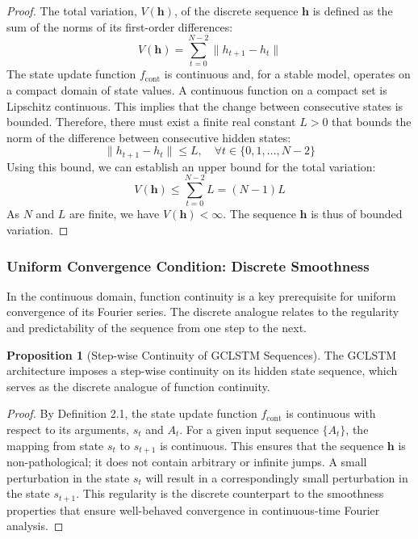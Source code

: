\documentclass{article}
\theoremstyle{remark}
\theoremstyle{definition}
\newtheorem{proposition}[theorem]{Proposition}
\begin{document}
\begin{proof}
The total variation, $V(\mathbf{h})$, of the discrete sequence $\mathbf{h}$ is defined as the sum of the norms of its first-order differences:
\begin{equation}
    V(\mathbf{h}) = \sum_{t=0}^{N-2} \|h_{t+1} - h_t\|
\end{equation}
The state update function $f_{\text{cont}}$ is continuous and, for a stable model, operates on a compact domain of state values. A continuous function on a compact set is Lipschitz continuous. This implies that the change between consecutive states is bounded. Therefore, there must exist a finite real constant $L > 0$ that bounds the norm of the difference between consecutive hidden states:
\begin{equation}
    \|h_{t+1} - h_t\| \le L, \quad \forall t \in \{0, 1, \dots, N-2\}
\end{equation}
Using this bound, we can establish an upper bound for the total variation:
\begin{equation}
    V(\mathbf{h}) \le \sum_{t=0}^{N-2} L = (N-1)L
\end{equation}
As $N$ and $L$ are finite, we have $V(\mathbf{h}) < \infty$. The sequence $\mathbf{h}$ is thus of bounded variation.
\end{proof}


\subsubsection{Uniform Convergence Condition: Discrete Smoothness}
In the continuous domain, function continuity is a key prerequisite for uniform convergence of its Fourier series. The discrete analogue relates to the regularity and predictability of the sequence from one step to the next.

\begin{proposition}[Step-wise Continuity of GCLSTM Sequences]
The GCLSTM architecture imposes a step-wise continuity on its hidden state sequence, which serves as the discrete analogue of function continuity.
\end{proposition}

\begin{proof}
By Definition 2.1, the state update function $f_{\text{cont}}$ is continuous with respect to its arguments, $s_t$ and $A_t$. For a given input sequence $\{A_t\}$, the mapping from state $s_t$ to $s_{t+1}$ is continuous. This ensures that the sequence $\mathbf{h}$ is non-pathological; it does not contain arbitrary or infinite jumps. A small perturbation in the state $s_t$ will result in a correspondingly small perturbation in the state $s_{t+1}$. This regularity is the discrete counterpart to the smoothness properties that ensure well-behaved convergence in continuous-time Fourier analysis.
\end{proof}
\end{document}
